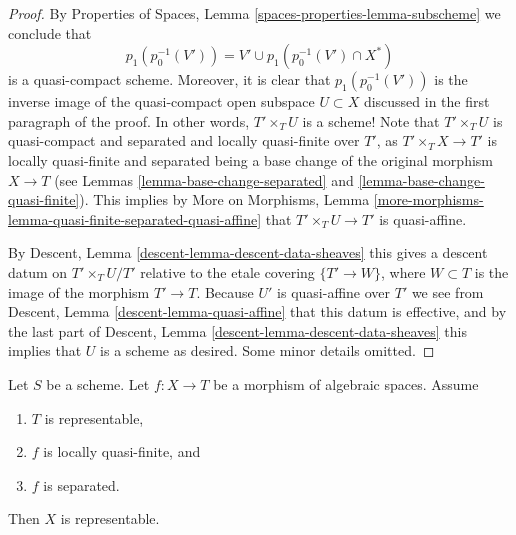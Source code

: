 \begin{proof}
\medskip\noindent
By
Properties of Spaces, Lemma \ref{spaces-properties-lemma-subscheme}
we conclude that
$$
p_1(p_0^{-1}(V')) =
V' \cup p_1(p_0^{-1}(V') \cap X^*)
$$
is a quasi-compact scheme. Moreover, it is clear that
$p_1(p_0^{-1}(V'))$ is the inverse image of the
quasi-compact open subspace $U \subset X$ discussed in the
first paragraph of the proof. In other words, $T' \times_T U$ is a scheme!
Note that $T' \times_T U$ is quasi-compact and
separated and locally quasi-finite over $T'$, as
$T' \times_T X \to T'$ is locally quasi-finite and separated
being a base change of the original morphism $X \to T$ (see
Lemmas \ref{lemma-base-change-separated} and
\ref{lemma-base-change-quasi-finite}).
This implies by
More on Morphisms,
Lemma \ref{more-morphisms-lemma-quasi-finite-separated-quasi-affine}
that $T' \times_T U \to T'$ is quasi-affine.

\medskip\noindent
By
Descent, Lemma \ref{descent-lemma-descent-data-sheaves}
this gives a descent datum on $T' \times_T U / T'$
relative to the etale covering $\{T' \to W\}$, where $W \subset T$
is the image of the morphism $T' \to T$.
Because $U'$ is quasi-affine over $T'$ we see from
Descent, Lemma \ref{descent-lemma-quasi-affine}
that this datum is effective, and by the last part of
Descent, Lemma \ref{descent-lemma-descent-data-sheaves}
this implies that $U$ is a scheme as desired.
Some minor details omitted.
\end{proof}

\begin{proposition}
\label{proposition-locally-quasi-finite-separated-over-scheme}
Let $S$ be a scheme.
Let $f : X \to T$ be a morphism of algebraic spaces.
Assume
\begin{enumerate}
\item $T$ is representable,
\item $f$ is locally quasi-finite, and
\item $f$ is separated.
\end{enumerate}
Then $X$ is representable.
\end{proposition}

